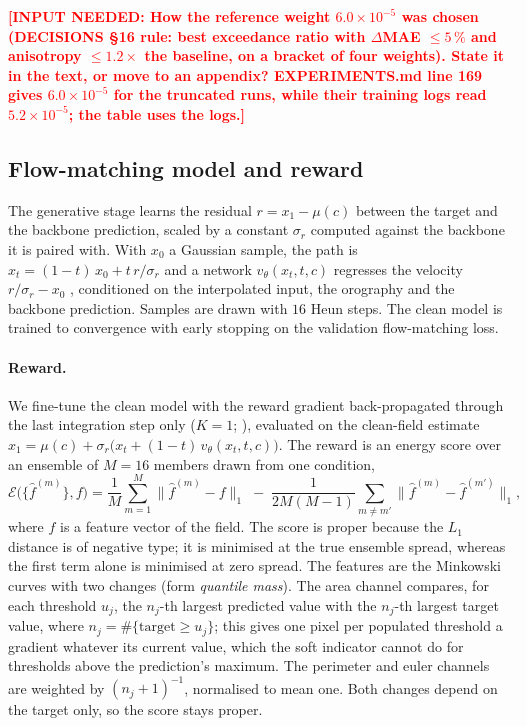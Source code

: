 \documentclass{article}
\newcommand{\needinput}[1]{\textcolor{red}{\textbf{[INPUT NEEDED: #1]}}}
\begin{document}
\needinput{How the reference weight $6.0\times10^{-5}$ was chosen (DECISIONS §16 rule: best exceedance ratio with
$\Delta$MAE $\le 5\,\%$ and anisotropy $\le 1.2\times$ the baseline, on a bracket of four weights). State it in the
text, or move to an appendix? EXPERIMENTS.md line 169 gives $6.0\times10^{-5}$ for the truncated runs, while their
training logs read $5.2\times10^{-5}$; the table uses the logs.}

\subsection{Flow-matching model and reward}
\label{sec:fm}
The generative stage learns the residual $r = x_1 - \mu(c)$ between the target and the backbone prediction, scaled by
a constant $\sigma_r$ computed against the backbone it is paired with. With $x_0$ a Gaussian sample, the path is
$x_t = (1-t)\,x_0 + t\,r/\sigma_r$ and a network $v_\theta(x_t, t, c)$ regresses the velocity $r/\sigma_r - x_0$
\citep{lipman2023flowmatching, liu2023rectifiedflow}, conditioned on the interpolated input, the orography and the
backbone prediction. Samples are drawn with $16$ Heun steps. The clean model is trained to convergence with early
stopping on the validation flow-matching loss.

\paragraph{Reward.} We fine-tune the clean model with the reward gradient back-propagated through the last integration
step only ($K = 1$; \citealp{clark2024draft}), evaluated on the clean-field estimate
$\hat{x}_1 = \mu(c) + \sigma_r\bigl(x_t + (1-t)\,v_\theta(x_t,t,c)\bigr)$. The reward is an energy score over an
ensemble of $M = 16$ members drawn from one condition,
\begin{equation}
  \mathcal{E}\bigl(\{\hat{f}^{(m)}\}, f\bigr)
  = \frac{1}{M} \sum_{m=1}^{M} \bigl\lVert \hat{f}^{(m)} - f \bigr\rVert_1
  \;-\; \frac{1}{2M(M-1)} \sum_{m \neq m'} \bigl\lVert \hat{f}^{(m)} - \hat{f}^{(m')} \bigr\rVert_1 ,
  \label{eq:energy}
\end{equation}
where $f$ is a feature vector of the field. The score is proper because the $L_1$ distance is of negative type; it is
minimised at the true ensemble spread, whereas the first term alone is minimised at zero spread. The features are the
Minkowski curves with two changes (form \emph{quantile mass}). The area channel compares, for each threshold $u_j$, the
$n_j$-th largest predicted value with the $n_j$-th largest target value, where $n_j = \#\{\text{target} \ge u_j\}$; this
gives one pixel per populated threshold a gradient whatever its current value, which the soft indicator cannot do for
thresholds above the prediction's maximum. The perimeter and euler channels are weighted by $(n_j + 1)^{-1}$, normalised
to mean one. Both changes depend on the target only, so the score stays proper.
\end{document}
